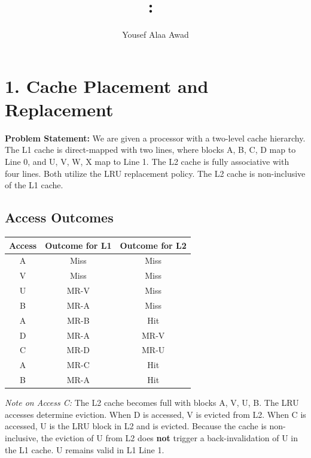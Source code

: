 \documentclass{article}
\title{
    \vspace{2in}
    \textmd{\textbf{\hmwkClass:\ \hmwkTitle}}\\
    \normalsize\vspace{0.1in}
}
\author{Yousef Alaa Awad}
\begin{document}
\maketitle
\pagebreak

\section{1. Cache Placement and Replacement}
\textbf{Problem Statement:} We are given a processor with a two-level cache hierarchy. The L1 cache is direct-mapped with two lines, where blocks A, B, C, D map to Line 0, and U, V, W, X map to Line 1. The L2 cache is fully associative with four lines. Both utilize the LRU replacement policy. The L2 cache is non-inclusive of the L1 cache.

\subsection{Access Outcomes}
\begin{table}[H]
	\centering
	\renewcommand{\arraystretch}{1.3}
	\begin{tabular}{|c|c|c|}
		\hline
		\textbf{Access} & \textbf{Outcome for L1} & \textbf{Outcome for L2} \\
		\hline
		A               & Miss                    & Miss                    \\
		\hline
		V               & Miss                    & Miss                    \\
		\hline
		U               & MR-V                    & Miss                    \\
		\hline
		B               & MR-A                    & Miss                    \\
		\hline
		A               & MR-B                    & Hit                     \\
		\hline
		D               & MR-A                    & MR-V                    \\
		\hline
		C               & MR-D                    & MR-U                    \\
		\hline
		A               & MR-C                    & Hit                     \\
		\hline
		B               & MR-A                    & Hit                     \\
		\hline
	\end{tabular}
\end{table}

\textit{Note on Access C:} The L2 cache becomes full with blocks A, V, U, B. The LRU accesses determine eviction. When D is accessed, V is evicted from L2. When C is accessed, U is the LRU block in L2 and is evicted. Because the cache is non-inclusive, the eviction of U from L2 does \textbf{not} trigger a back-invalidation of U in the L1 cache. U remains valid in L1 Line 1.
\end{document}
